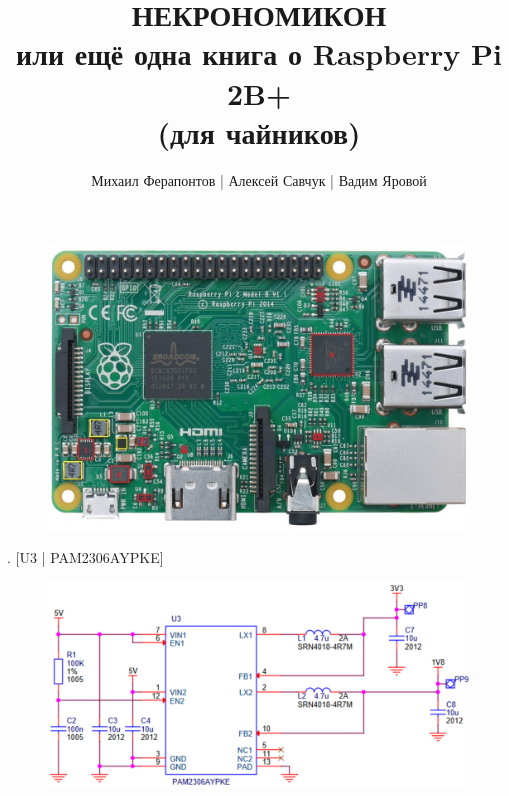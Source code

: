 


\title{НЕКРОНОМИКОН\\или ещё одна книга о Raspberry Pi 2B+\\(для чайников)}
\author{Михаил Ферапонтов | Алексей Савчук | Вадим Яровой}
\date{\the\year}



\maketitle

\newpage
\begin{figure}[H]
  \centering
  \includegraphics[width=\textwidth]{img/raspberry-photo-edited.jpg}
\end{figure}

. [U3 | PAM2306AYPKE]
\begin{figure}[H]
  \centering
  \includegraphics[width=\textwidth]{img/U3.pdf}
\end{figure}

